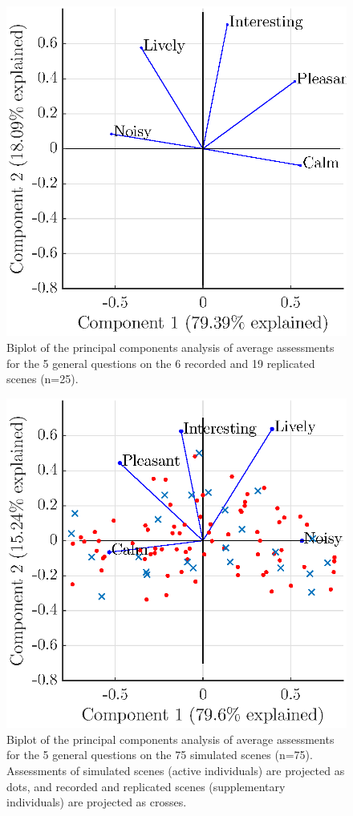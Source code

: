 \documentclass[twocolumn]{article}
\begin{document}
\begin{figure}[th]
    \centering
    \includegraphics[width=0.8\columnwidth]{figures/pca_recrep.eps}
    \caption{Biplot of the principal components analysis of average assessments for the 5 general questions on the 6 recorded and 19 replicated scenes (n=25).}\label{fig:pspace_rec}
\end{figure}
\begin{figure}[h]
    \centering
    \includegraphics[width=0.8\columnwidth]{figures/pca_sim2.eps}
    \caption{Biplot of the principal components analysis of average assessments for the 5 general questions on the 75 simulated scenes (n=75). Assessments of simulated scenes (active individuals) are projected as dots, and recorded and replicated scenes (supplementary individuals) are projected as crosses.}\label{fig:pspace_sim}
\end{figure}
\end{document}
